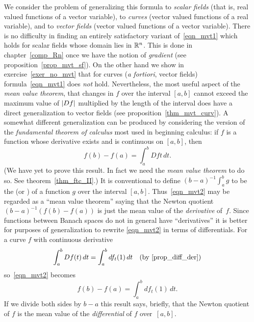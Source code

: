 We consider the problem of generalizing this formula to
\emph{scalar fields} (that is, real valued functions of a vector
variable), to
\emph{curves} (vector valued functions of a real variable), and to
\emph{vector fields} (vector valued functions of a vector variable).  There is no difficulty
in finding an entirely satisfactory variant of~\eqref{eqn_mvt1} which holds for scalar fields
whose domain lies in $\mathbb{R}^n$.  This is done in chapter~\ref{comp_Rn} once we have the notion of
\emph{gradient} (see proposition~\ref{prop_mvt_sf}).  On the other hand we show in
exercise~\ref{exer_no_mvt} that for curves (\emph{a fortiori}, vector fields)
formula~\eqref{eqn_mvt1} does \emph{not} hold. Nevertheless, the most useful aspect of the
\emph{mean value theorem}, that changes in $f$ over the interval $[a,b]$ cannot exceed the
maximum value of $\lvert Df\rvert$ multiplied by the length of the interval does have a direct
generalization to vector fields (see proposition~\ref{thm_mvt_curv}).  A somewhat different
generalization can be produced by considering the version of the \emph{fundamental theorem of
calculus} most used in beginning calculus: if $f$ is a function whose derivative exists and is
continuous on $[a,b]$, then
 \begin{equation}\label{eqn_mvt2}
     f(b) - f(a) = \int_a^bDft\,dt.
 \end{equation}
(We have yet to prove this result.  In fact we need the \emph{mean value theorem} to do so.
See theorem~\ref{thm_ftc_II}.)  It is conventional to define $(b - a)^{-1}\int_a^bg$ to be the
 (or
) of a function $g$ over the interval $[a,b]$. Thus~\eqref{eqn_mvt2} may be
regarded as a ``mean value theorem'' saying that the Newton quotient $(b-a)^{-1}(f(b)-f(a))$
is just the mean value of the \emph{derivative} of~$f$.  Since functions between Banach spaces
do not in general have ``derivatives'' it is better for purposes of generalization to rewrite
\eqref{eqn_mvt2} in terms of differentials.  For a curve $f$ with continuous derivative
  \[ \int_a^bDf(t)\,dt = \int_a^bdf_t(1)\,dt
                       \quad\text{(by~\ref{prop_diff_der})} \]
so~\eqref{eqn_mvt2} becomes
 \begin{equation}\label{eqn_mvt3}
          f(b) - f(a) = \int_a^bdf_t(1)\,dt.
 \end{equation}
If we divide both sides by $b - a$ this result says, briefly, that the Newton quotient of $f$
is the mean value of the \emph{differential} of $f$ over~$[a,b]$.

